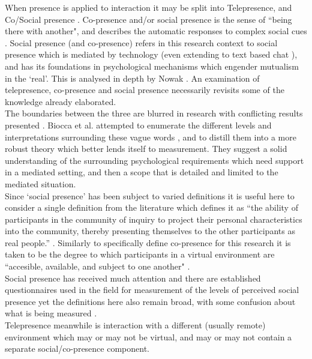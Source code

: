 When presence is applied to interaction it may be split into Telepresence, and Co/Social presence  \cite{heeter1992being, Biocca1997}.  Co-presence and/or social presence is the sense of ``being there with another", and describes the automatic responses to complex social cues \cite{doi:10.1080/01449299508914633, fulk1987social, haythornthwaite1995work}.    Social presence (and co-presence) refers in this research context to social presence which is mediated by technology (even extending to text based chat \cite{Gunawardena1997}), and has its foundations in psychological mechanisms which engender mutualism in the `real'. This is analysed in depth by Nowak \cite{Nowak2001}. An examination of telepresence, co-presence and social presence necessarily revisits some of the knowledge already elaborated.\\
        The boundaries between the three are blurred in research with conflicting results presented \cite{Bulu2012}. Biocca et al. attempted to enumerate the different levels and interpretations surrounding these vague words \cite{Biocca2003}, and to distill them into a more robust theory which better lends itself to measurement. They suggest a solid understanding of the surrounding psychological requirements which need support in a mediated setting, and then a scope that is detailed and limited to the mediated situation.\\
 Since `social presence' has been subject to varied definitions \cite{Biocca2003} it is useful here to consider a single definition from the literature which defines it as ``the ability of participants in the community of inquiry to project their personal characteristics into the community, thereby presenting themselves to the other participants as real people.'' \cite{Garrison1999, Beck2011}. Similarly to specifically define co-presence for this research it is taken to be the degree to which participants in a virtual environment are ``accesible, available, and subject to one another" \cite{Biocca2003}. \\
            Social presence has received much attention and there are established questionnaires used in the field for measurement of the levels of perceived social presence yet the definitions here also remain broad, with some confusion about what is being measured \cite{Biocca2003a}.\\            
 Telepresence meanwhile is interaction with a different (usually remote) environment which may or may not be virtual, and may or may not contain a separate social/co-presence component. \\ 
